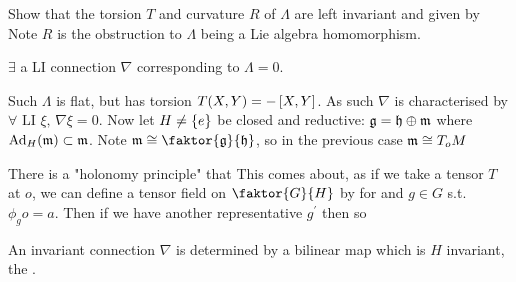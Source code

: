 \documentclass{article}
\begin{document}
\begin{ex}
Show that the torsion $T$ and curvature $R$ of $\Lambda$ are left invariant and given by 
Note $R$ is the obstruction to $\Lambda$ being a Lie algebra homomorphism. 
\end{ex}

\begin{claim}
$\exists$ a LI connection $\nabla$ corresponding to $\Lambda=0$. 
\end{claim} 
Such $\Lambda$ is flat, but has torsion $T(X,Y) = - \comm[X]{Y}$. As such $\nabla$ is characterised by $\forall \text{ LI } \xi , \, \nabla\xi = 0$. Now let $H \neq \pbrace{e}$ be closed and reductive: $\mf{g} = \mf{h} \oplus \mf{m}$ where $\Ad_H(\mf{m}) \subset \mf{m}$. Note $\mf{m}\cong \faktor{\mf{g}}{\mf{h}}$, so in the previous case $\mf{m}\cong T_oM$

\begin{aside}
There is a "holonomy principle" that 
This comes about, as if we take a tensor $T$ at $o$, we can define a tensor field on $\faktor{G}{H}$ by 
for and $g \in G$ s.t. $\phi_g o = a$. Then if we have another representative $g^\prime$ then 
so 
\end{aside}

\begin{claim}
An invariant connection $\nabla$ is determined by a bilinear map 
which is $H$ invariant, the . 
\end{claim}
\end{document}
